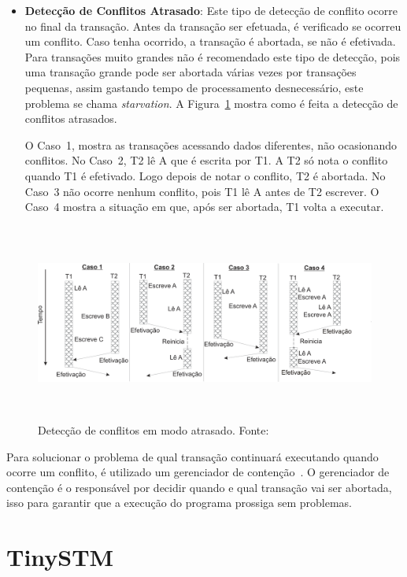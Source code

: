 \documentclass[diss,capa]{texufpel}
\begin{document}
\begin{itemize}
\item \textbf{Detecção de Conflitos Atrasado}: Este tipo de detecção de conflito ocorre no final da transação.  Antes da transação ser efetuada, é verificado se ocorreu um conflito. Caso tenha ocorrido, a transação é abortada, se não é efetivada. Para transações muito grandes não é recomendado este tipo de detecção, pois uma transação grande pode ser abortada várias vezes por transações pequenas, assim gastando tempo de processamento desnecessário, este problema se chama \emph{starvation}. A Figura~\ref{figuradeteccaoatrasado} mostra como é feita a detecção de conflitos atrasados.

O Caso~1, mostra as transações acessando dados diferentes, não ocasionando conflitos. No Caso~2, T2 lê A que é escrita por T1. A T2 só nota o conflito quando T1 é efetivado. Logo depois de notar o conflito, T2 é abortada. No Caso~3 não ocorre nenhum conflito, pois T1 lê A antes de T2 escrever. O Caso~4 mostra a situação em que, após ser abortada, T1 volta a executar.
\end{itemize}

\begin{figure}[!htp]
\centering
\includegraphics[height=6.5cm]{images/conflitoatrasado.png}
\caption{Detecção de conflitos em modo atrasado. Fonte:~\cite{rigotm}}
\label{figuradeteccaoatrasado}
\end{figure}

Para solucionar o problema de qual transação continuará executando quando ocorre um conflito, é utilizado um gerenciador de contenção~\cite{TM2010}. O gerenciador de contenção é o responsável por decidir quando e qual transação vai ser abortada, isso para garantir que a execução do programa prossiga sem problemas.

\section{TinySTM}
\end{document}
